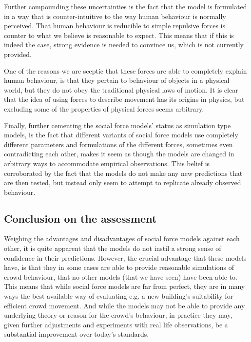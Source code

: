 Further compounding these uncertainties is the fact that the model is 
formulated in a way that is counter-intuitive to the way human behaviour is 
normally perceived. That human behaviour is reducible to simple repulsive 
forces is counter to what we believe is reasonable to expect. This means that 
if this is indeed the case, strong evidence is needed to convince us, which is 
not currently provided.

One of the reasons we are sceptic that these forces are able to completely 
explain human behaviour, is that they pertain to behaviour of objects in a 
physical world, but they do not obey the traditional physical laws of motion.  
It is clear that the idea of using forces to describe movement has its origins 
in physics, but excluding some of the properties of physical forces seems 
arbitrary.

Finally, further cementing the social force models' status as simulation type 
models, is the fact that different variants of social force models use 
completely different parameters and formulations of the different forces, 
sometimes even contradicting each other, makes it seem as though the models 
are changed in arbitrary ways to accommodate empirical observations. This 
belief is corroborated by the fact that the models do not make any new 
predictions that are then tested, but instead only seem to attempt to 
replicate already observed behaviour.

\subsection{Conclusion on the assessment}
Weighing the advantages and disadvantages of social force models against each 
other, it is quite apparent that the models do not instil a strong sense of 
confidence in their predictions. However, the crucial advantage that these 
models have, is that they in some cases are able to provide reasonable 
simulations of crowd behaviour, that no other models (that we have seen) have 
been able to. This means that while social force models are far from perfect, 
they are in many ways the best available way of evaluating e.g. a new 
building's suitability for efficient crowd movement. And while the models may 
not be able to provide any underlying theory or reason for the crowd's 
behaviour, in practice they may, given further adjustments and experiments 
with real life observations, be a substantial improvement over today's 
standards.
